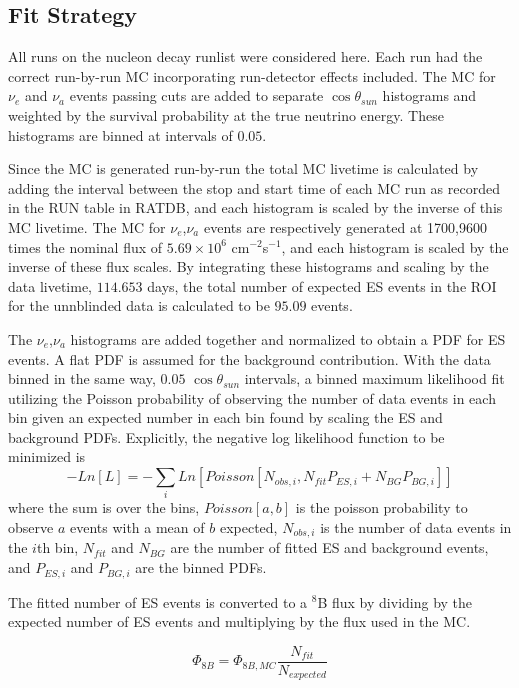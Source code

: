 \subsection{Fit Strategy}
\label{sec:solar:fit_strategy}

All runs on the nucleon decay runlist were considered here.
Each run had the correct run-by-run MC incorporating run-detector effects included.
The MC for $\nu_e$ and $\nu_a$ events passing cuts are added to separate
$\cos{\theta_{sun}}$ histograms and weighted by the survival probability at the
true neutrino energy.
These histograms are binned at intervals of $0.05$.

Since the MC is generated run-by-run the total MC livetime is calculated by
adding the interval between the stop and start time of each MC run as recorded
in the RUN table in RATDB, and each histogram is scaled by the inverse of this
MC livetime.
The MC for $\nu_e$,$\nu_a$ events are respectively generated at 1700,9600 times
the nominal flux of $5.69\times10^{6}$ cm$^{-2}$s$^{-1}$, and each histogram is
scaled by the inverse of these flux scales.
By integrating these histograms and scaling by the data livetime, $114.653$ days,
the total number of expected ES events in the ROI for the unnblinded data is 
calculated to be $95.09$ events.

The $\nu_e$,$\nu_a$ histograms are added together and normalized to obtain a PDF
for ES events.
A flat PDF is assumed for the background contribution.
With the data binned in the same way, $0.05$ $\cos{\theta_{sun}}$ intervals, a
binned maximum likelihood fit utilizing the Poisson probability of observing the 
number of data events in each bin given an expected number in each bin found by 
scaling the ES and background PDFs.
Explicitly, the negative log likelihood function to be minimized is
\begin{equation}
-Ln[L] = -\sum_i Ln[Poisson\left[N_{obs,i},N_{fit} P_{ES,i}+ N_{BG} P_{BG,i}\right]]
\end{equation}
where the sum is over the bins,  $Poisson[a,b]$ is the poisson probability to 
observe $a$ events with a  mean of $b$ expected, $N_{obs,i}$ is the number of 
data events in the $i$th bin, $N_{fit}$ and $N_{BG}$ are the number of fitted 
ES and background events, and $P_{ES,i}$ and $P_{BG,i}$ are the binned PDFs.

The fitted number of ES events is converted to a $^8$B flux by dividing by the 
expected number of ES events and multiplying by the flux used in the MC.

\begin{equation}
\Phi_{8B} = \Phi_{8B,MC}\frac{N_{fit}}{N_{expected}}
\end{equation}

